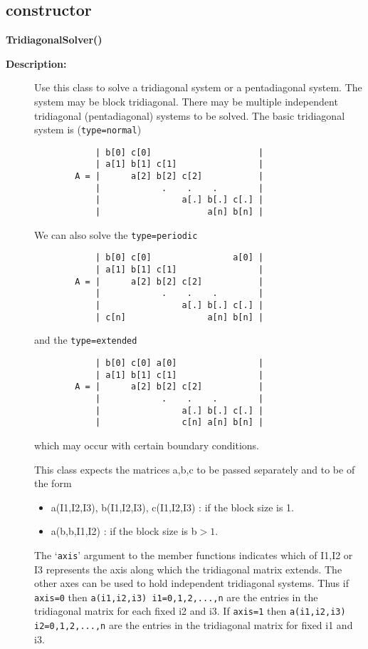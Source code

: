 \subsection{constructor}
 
\newlength{\TridiagonalSolverIncludeArgIndent}
\begin{flushleft} \textbf{%
\settowidth{\TridiagonalSolverIncludeArgIndent}{TridiagonalSolver(}%
TridiagonalSolver() 
}\end{flushleft}
\begin{description}
\item[{\bf Description:}] 
   Use this class to solve a tridiagonal system or a pentadiagonal system. 
  The system may be block tridiagonal. There may
  be multiple independent tridiagonal (pentadiagonal) systems to be solved.
  The basic tridiagonal system is ({\tt type=normal})
 \begin{verbatim}
            | b[0] c[0]                     |
            | a[1] b[1] c[1]                |
        A = |      a[2] b[2] c[2]           |
            |            .    .    .        |
            |                a[.] b[.] c[.] |
            |                     a[n] b[n] |

 \end{verbatim}
 We can also solve the {\tt type=periodic}
 \begin{verbatim}
            | b[0] c[0]                a[0] |
            | a[1] b[1] c[1]                |
        A = |      a[2] b[2] c[2]           |
            |            .    .    .        |
            |                a[.] b[.] c[.] |
            | c[n]                a[n] b[n] |

 \end{verbatim}
 and the {\tt type=extended}
 \begin{verbatim}
            | b[0] c[0] a[0]                |
            | a[1] b[1] c[1]                |
        A = |      a[2] b[2] c[2]           |
            |            .    .    .        |
            |                a[.] b[.] c[.] |
            |                c[n] a[n] b[n] |

 \end{verbatim}
 which may occur with certain boundary conditions.

 This class expects the matrices a,b,c to be passed separately and to be of the 
 form
 \begin{itemize}
  \item a(I1,I2,I3), b(I1,I2,I3), c(I1,I2,I3) : if the block size is 1.
  \item a(b,b,I1,I2) : if the block size is b$>1$.
 \end{itemize}
  The `{\tt axis}' argument to the member functions indicates which of I1,I2 or I3
  represents the axis along which the tridiagonal matrix extends. The other axes
  can be used to hold independent tridiagonal systems. Thus if {\tt axis=0} then
  {\tt a(i1,i2,i3) i1=0,1,2,...,n} are the entries in the tridiagonal matrix for
  each fixed i2 and i3. If {\tt axis=1} then {\tt a(i1,i2,i3) i2=0,1,2,...,n} 
 are the entries in the tridiagonal matrix for fixed i1 and i3.
\end{description}
